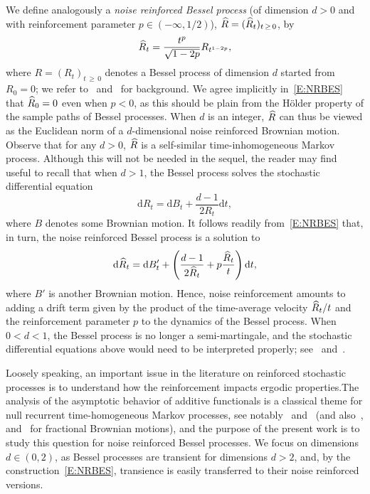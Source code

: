 \documentclass[10pt]{amsart}
\theoremstyle{definition}\newtheorem{defi}[theo]{Definition}\newtheorem{rema}[theo]{Remark}\newtheorem{exam}[theo]{Example}\newtheorem{exem}[theo]{Example}\newtheorem{nota}[theo]{Notation}
\renewcommand{\hat}[1]{\widehat{#1}}
\newcommand{\dd}{\mathrm{d}}
\let\oldhat\hat
\renewcommand*{\hat}[1]{\mathchoice{\widehat{#1}}{\widehat{#1}}{\oldhat{#1}}{\oldhat{#1}}}
\begin{document}
We define analogously a \emph{noise reinforced Bessel process} (of dimension $d>0$ and with reinforcement parameter $p\in(-\infty,1/2)$), $\hat R=(\hat R_t)_{t\,\geq\,0}$, by
\begin{equation}\label{E:NRBES}
\hat R_t = \frac{t^{p}}{\sqrt{1-2p}}{R_{t^{1-2p}}},
\end{equation}
where $R=(R_t)_{t\,\geq\,0}$ denotes a Bessel process of dimension $d$ started from $R_0=0$; we refer to~\cite[Section~XI.1]{RY} and~\cite{Lawler} for background. We agree implicitly in~\eqref{E:NRBES} that $\hat R_0=0$ even when $p<0$, as this should be plain from the H\"older property of the sample paths of Bessel processes. When $d$ is an integer, $\hat R$ can thus be viewed as the Euclidean norm of a $d$-dimensional noise reinforced Brownian motion. Observe that for any $d>0$, $\hat R$ is a self-similar time-inhomogeneous Markov process. Although this will not be needed in the sequel, the reader may find useful to recall that when $d>1$, the Bessel process solves the stochastic differential equation
\[
\dd R_t= \dd B_t + \frac{d-1}{2R_t} \dd t,
\]
where $B$ denotes some Brownian motion. It follows readily from~\eqref{E:NRBES} that, in turn, the noise reinforced Bessel process is a solution to
\[
\dd \hat R_t=\dd B'_t + \left(\frac{d-1}{2 \hat R_t} + p \frac{ \hat R_t}{t} \right) \dd t,
\]
where $B'$ is another Brownian motion. Hence, noise reinforcement amounts to adding a drift term given by the product of the time-average velocity $\hat R_t/t$ and the reinforcement parameter $p$ to the dynamics of the Bessel process. When $0< d < 1$, the Bessel process is no longer a semi-martingale, and the stochastic differential equations above would need to be interpreted properly; see~\cite{BerBes} and~\cite[Chapter~10]{MansuyYor}.



Loosely speaking, an important issue in the literature on reinforced stochastic processes is to understand how the reinforcement impacts ergodic properties.\linebreak The analysis of the asymptotic behavior of additive functionals is a classical theme for null recurrent time-homogeneous Markov processes, see notably~\cite{DK,KK,KR,PSV} and~\cite[Section~XIII.2]{RY} (and also~\cite{KaMa}, \cite{Kono} and~\cite{HNX} for fractional Brownian motions), and the purpose of the present work is to study this question for noise reinforced Bessel processes. We focus on dimensions $d\in(0,2)$, as Bessel processes are transient for dimensions $d>2$, and, by the construction~\eqref{E:NRBES}, transience is easily transferred to their noise reinforced versions.
\end{document}
